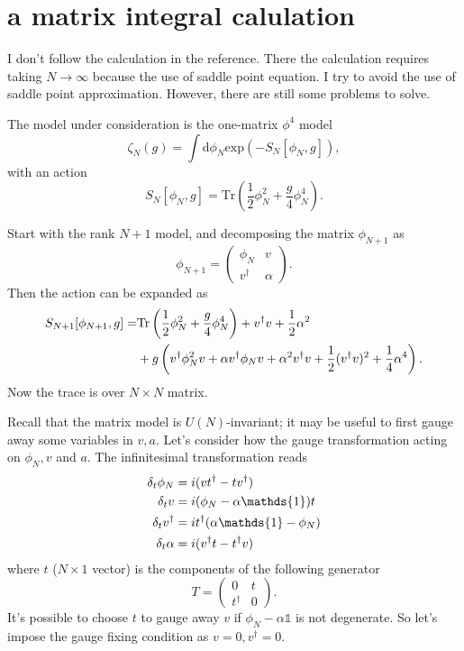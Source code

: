 \section{a matrix integral calulation}
I don't follow the calculation in the reference.
There the calculation requires taking $N\to\infty$ because the use of saddle point equation.
I try to avoid the use of saddle point approximation.
However, there are still some problems to solve.

The model under consideration is the one-matrix $\phi^4$ model
\begin{equation}
    \zeta_N(g) = \int \mathrm{d}\phi_N \mathrm{exp}(-S_N[\phi_N,g]),
\end{equation}
with an action
\begin{equation}
    S_N[\phi_N,g] = \mathrm{Tr} (\frac{1}{2}\phi_N^2 + \frac{g}{4}\phi_N^4).
\end{equation}

Start with the rank $N+1$ model, and decomposing the matrix $\phi_{N+1}$ as
\begin{equation}
    \phi_{N+1} = \begin{pmatrix}
\phi_N & v\\ 
 v^\dagger & \alpha
\end{pmatrix}.
\end{equation}
Then the action can be expanded as
\begin{align}
	S_{N+1}[\phi_{N+1},g] = &\mathrm{Tr}\left( \frac{1}{2}\phi_N^2+\frac{g}{4}\phi_N^4\right) + v^\dagger v + \frac{1}{2}\alpha^2 \notag \\
	&+ g\left( v^\dagger \phi_N^2 v + \alpha v^\dagger \phi_N v + \alpha^2v^\dagger v + \frac{1}{2}(v^\dagger v)^2 + \frac{1}{4}\alpha^4\right ).
\end{align}
Now the trace is over $N\times N$ matrix.

Recall that the matrix model is $U(N)$-invariant;
it may be useful to first gauge away some variables in $v,a$.
Let's consider how the gauge transformation acting on $\phi_N, v$ and $a$.
The infinitesimal transformation reads
\begin{align}
    \delta_t\phi_N &= i (vt^\dagger - tv^\dagger) \notag\\
	\delta_t v &= i(\phi_N - \alpha\mathds{1})t\notag\\
\delta_t v^\dagger &= it^\dagger (\alpha\mathds{1}-\phi_N) \notag\\
\delta_t \alpha &= i(v^\dagger t - t^\dagger v)
\end{align}
where $t$ ($N\times 1$ vector) is the components of the following generator
\[
 T = \begin{pmatrix}
	 0 & t \\
	 t^\dagger & 0
 \end{pmatrix}
.\] 
It's possible to choose $t$ to gauge away $v$ if $\phi_N - \alpha \mathds{1}$ is not degenerate.
So let's impose the gauge fixing condition as $v=0,v^\dagger=0$.

